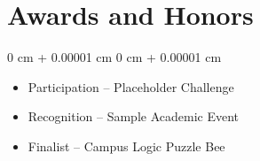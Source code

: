 \documentclass[10pt, letterpaper]{article}
\newenvironment{highlights}{
    \begin{itemize}[
        topsep=0.10 cm,
        parsep=0.10 cm,
        partopsep=0pt,
        itemsep=0pt,
        leftmargin=0 cm + 10pt
    ]
}{
    \end{itemize}
} %
\newenvironment{onecolentry}{
    \begin{adjustwidth}{
        0 cm + 0.00001 cm
    }{
        0 cm + 0.00001 cm
    }
}{
    \end{adjustwidth}
} %
\begin{document}
\section{Awards and Honors}
\begin{onecolentry}
\begin{highlights}
    \item Participation – Placeholder Challenge
    \item Recognition – Sample Academic Event
    \item Finalist – Campus Logic Puzzle Bee
\end{highlights}
\end{onecolentry}
\end{document}
